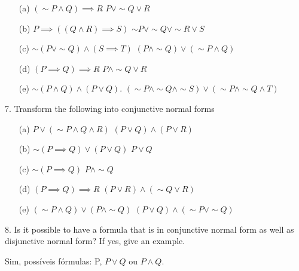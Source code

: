 \begin{enumerate}
 \item[(a)] $ (\sim P \wedge Q) \implies R $ \newline
$P \vee \sim Q \vee R$
 \item[(b)] $ P \implies \left( ( Q \wedge R) \implies S \right)$ \newline
$ \sim P \vee \sim Q \vee \sim R \vee S $
 \item[(c)] $ \sim (P \vee \sim Q) \wedge (S \implies T) $ \newline
$ (P \wedge \sim Q) \vee (\sim P \wedge Q) $
 \item[(d)] $ (P \implies Q) \implies R $ \newline
$ P \wedge \sim Q \vee R $
 \item[(e)] $ \sim (P \wedge Q) \wedge (P \vee Q) $. \newline
$ (\sim P \wedge \sim Q \wedge \sim S) \vee (\sim P \wedge \sim Q \wedge T) $
\end{enumerate}

7. Transform the following into conjunctive normal forms
\begin{itemize}
 \item[(a)] $ P \vee (\sim P \wedge Q \wedge R) $ \newline
$(P \vee Q) \wedge (P \vee R) $
 \item[(b)] $ \sim (P \implies Q) \vee (P \vee Q) $ \newline
$ P \vee Q $
 \item[(c)] $ \sim (P \implies Q) $ \newline
$ P \wedge \sim Q $
 \item[(d)] $ (P \implies Q) \implies R $ \newline
$ (P \vee R) \wedge (\sim Q \vee R) $
 \item[(e)] $ (\sim P \wedge Q) \vee (P \wedge \sim Q) $ \newline
$ (P \vee Q) \wedge (\sim P \vee \sim Q) $
\end{itemize}

8. Is it possible to have a formula that is in conjunctive normal form as well as disjunctive normal form? If yes, give an example.

Sim, possíveis fórmulas: P, $ P \vee Q $ ou $ P \wedge Q $.

